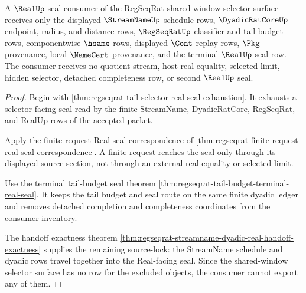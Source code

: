 \begin{theorem}
\label{thm:regseqrat-real-seal-selector-nonescape}
A $\RealUp$ seal consumer of the RegSeqRat shared-window selector surface receives only the displayed $\StreamNameUp$ schedule rows, $\DyadicRatCoreUp$ endpoint, radius, and distance rows, $\RegSeqRatUp$ classifier and tail-budget rows, componentwise $\hsame$ rows, displayed $\Cont$ replay rows, $\Pkg$ provenance, local $\NameCert$ provenance, and the terminal $\RealUp$ seal row. The consumer receives no quotient stream, host real equality, selected limit, hidden selector, detached completeness row, or second $\RealUp$ seal.
\end{theorem}
\begin{proof}
Begin with \autoref{thm:regseqrat-tail-selector-real-seal-exhaustion}. It exhausts a selector-facing seal read by the finite StreamName, DyadicRatCore, RegSeqRat, and RealUp rows of the accepted packet.

Apply the finite request Real seal correspondence of \autoref{thm:regseqrat-finite-request-real-seal-correspondence}. A finite request reaches the seal only through its displayed source section, not through an external real equality or selected limit.

Use the terminal tail-budget seal theorem \autoref{thm:regseqrat-tail-budget-terminal-real-seal}. It keeps the tail budget and seal route on the same finite dyadic ledger and removes detached completion and completeness coordinates from the consumer inventory.

The handoff exactness theorem \autoref{thm:regseqrat-streamname-dyadic-real-handoff-exactness} supplies the remaining source-lock: the StreamName schedule and dyadic rows travel together into the Real-facing seal. Since the shared-window selector surface has no row for the excluded objects, the consumer cannot export any of them.
\end{proof}

